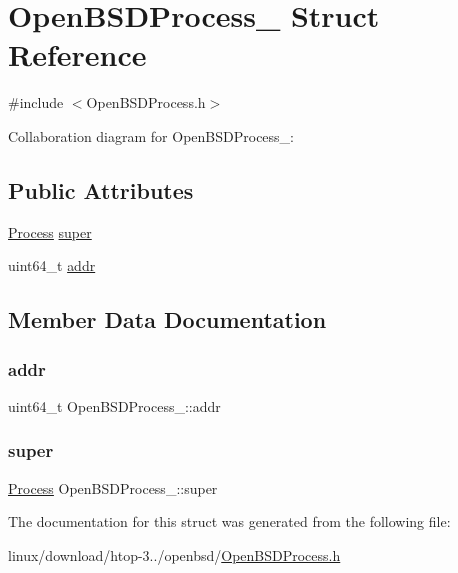 \hypertarget{structOpenBSDProcess__}{}\section{Open\+B\+S\+D\+Process\+\_\+ Struct Reference}
\label{structOpenBSDProcess__}


{\ttfamily \#include $<$Open\+B\+S\+D\+Process.\+h$>$}



Collaboration diagram for Open\+B\+S\+D\+Process\+\_\+\+:
\subsection*{Public Attributes}
\begin{DoxyCompactItemize}
\item 
\hyperlink{Process_8h_a20673e8fa40981a168bf0e196c4cef3b}{Process} \hyperlink{structOpenBSDProcess___a7e20058733e59d4bc22c6a408f0a9725}{super}
\item 
uint64\+\_\+t \hyperlink{structOpenBSDProcess___a5fd44ea7a741b34b2aa5094595db49df}{addr}
\end{DoxyCompactItemize}


\subsection{Member Data Documentation}
\mbox{\label{structOpenBSDProcess___a5fd44ea7a741b34b2aa5094595db49df}} 
\subsubsection{\texorpdfstring{addr}{addr}}
{\footnotesize\ttfamily uint64\+\_\+t Open\+B\+S\+D\+Process\+\_\+\+::addr}

\mbox{\label{structOpenBSDProcess___a7e20058733e59d4bc22c6a408f0a9725}} 
\subsubsection{\texorpdfstring{super}{super}}
{\footnotesize\ttfamily \hyperlink{Process_8h_a20673e8fa40981a168bf0e196c4cef3b}{Process} Open\+B\+S\+D\+Process\+\_\+\+::super}



The documentation for this struct was generated from the following file\+:\begin{DoxyCompactItemize}
\item 
linux/download/htop-\/3../openbsd/\hyperlink{OpenBSDProcess_8h}{Open\+B\+S\+D\+Process.\+h}\end{DoxyCompactItemize}
